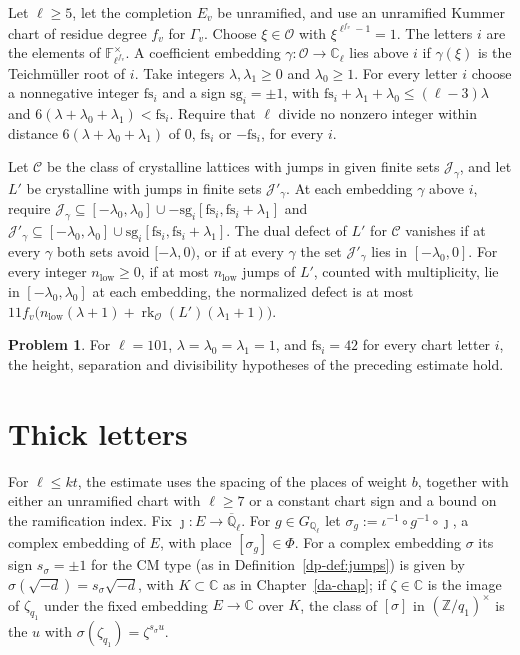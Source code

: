 \documentclass[reqno]{amsart}
\newcounter{chap}
\theoremstyle{definition}
\newtheorem{problem}{Problem}[section]
\theoremstyle{plain}
\newcommand{\Z}{\mathbb{Z}}
\newcommand{\Q}{\mathbb{Q}}
\newcommand{\C}{\mathbb{C}}
\newcommand{\Oc}{\mathcal{O}}
\newcommand{\rk}{\operatorname{rk}}
\newcommand{\Gl}{G_{\Q_\ell}}
\begin{document}
Let \(\ell\ge5\), let the completion \(E_v\) be unramified, and use an unramified Kummer chart of residue degree \(f_v\) for \(\Gamma_v\).  Choose \(\xi\in\Oc\) with \(\xi^{\ell^{f_v}-1}=1\).  The letters \(i\) are the elements of \(\mathbb F_{\ell^{f_v}}^\times\).  A coefficient embedding \(\gamma\colon\Oc\to\C_\ell\) lies above \(i\) if \(\gamma(\xi)\) is the Teichmüller root of \(i\).  Take integers \(\lambda,\lambda_1\ge0\) and \(\lambda_0\ge1\).  For every letter \(i\) choose a nonnegative integer \(\mathrm{fs}_i\) and a sign \(\mathrm{sg}_i=\pm1\), with \(\mathrm{fs}_i+\lambda_1+\lambda_0\le(\ell-3)\lambda\) and \(6(\lambda+\lambda_0+\lambda_1)<\mathrm{fs}_i\).  Require that \(\ell\) divide no nonzero integer within distance \(6(\lambda+\lambda_0+\lambda_1)\) of \(0\), \(\mathrm{fs}_i\) or \(-\mathrm{fs}_i\), for every \(i\).

Let \(\mathcal C\) be the class of crystalline lattices with jumps in given finite sets \(\mathcal J_\gamma\), and let \(L'\) be crystalline with jumps in finite sets \(\mathcal J'_\gamma\).  At each embedding \(\gamma\) above \(i\), require \(\mathcal J_\gamma\subseteq[-\lambda_0,\lambda_0]\cup-\mathrm{sg}_i[\mathrm{fs}_i,\mathrm{fs}_i+\lambda_1]\) and \(\mathcal J'_\gamma\subseteq[-\lambda_0,\lambda_0]\cup\mathrm{sg}_i[\mathrm{fs}_i,\mathrm{fs}_i+\lambda_1]\).  The dual defect of \(L'\) for \(\mathcal C\) vanishes if at every \(\gamma\) both sets avoid \([-\lambda,0)\), or if at every \(\gamma\) the set \(\mathcal J'_\gamma\) lies in \([-\lambda_0,0]\).  For every integer \(n_{\mathrm{low}}\ge0\), if at most \(n_{\mathrm{low}}\) jumps of \(L'\), counted with multiplicity, lie in \([-\lambda_0,\lambda_0]\) at each embedding, the normalized defect is at most \(11 f_v\bigl(n_{\mathrm{low}}(\lambda+1)+\rk_{\Oc}(L')(\lambda_1+1)\bigr)\).

\begin{problem}\label{pr:far-start}
For \(\ell=101\), \(\lambda=\lambda_0=\lambda_1=1\), and \(\mathrm{fs}_i=42\) for every chart letter \(i\), the height, separation and divisibility hypotheses of the preceding estimate hold.
\end{problem}

\section{Thick letters}\label{sec:letters}

For \(\ell\le kt\), the estimate uses the spacing of the places of weight \(b\), together with either an unramified chart with \(\ell\ge7\) or a constant chart sign and a bound on the ramification index.  Fix \(\jmath\colon E \to \overline{\Q}_\ell\).  For \(g \in \Gl\) let \(\sigma_g := \iota^{-1}\circ g^{-1}\circ \jmath\), a complex embedding of \(E\), with place \([\sigma_g] \in \Phi\).  For a complex embedding \(\sigma\) its sign \(s_\sigma = \pm 1\) for the CM type (as in Definition~\ref{dp-def:jumps}) is given by \(\sigma(\sqrt{-d}) = s_\sigma\sqrt{-d}\), with \(K \subset \C\) as in Chapter~\ref{da-chap}; if \(\zeta \in \C\) is the image of \(\zeta_{q_1}\) under the fixed embedding \(E \to \C\) over \(K\), the class of \([\sigma]\) in \((\Z/q_1)^\times\) is the \(u\) with \(\sigma(\zeta_{q_1}) = \zeta^{s_\sigma u}\).
\end{document}
